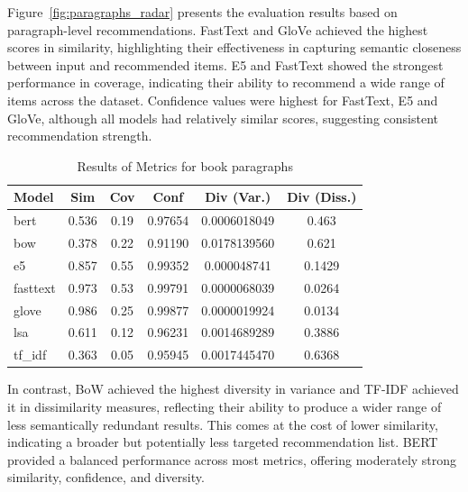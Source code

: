 \documentclass[\myFontSize,a4paper,oneside,hidelinks]{article}
\begin{document}
Figure~\ref{fig:paragraphs_radar} presents the evaluation results based on paragraph-level recommendations. FastText and GloVe achieved the highest scores in similarity, highlighting their effectiveness in capturing semantic closeness between input and recommended items. E5 and FastText showed the strongest performance in coverage, indicating their ability to recommend a wide range of items across the dataset. Confidence values were highest for FastText, E5 and GloVe, although all models had relatively similar scores, suggesting consistent recommendation strength.


\begin{table}[h!]
\centering
\large
\begin{tabular}{|l|c|c|c|c|c|}
\hline
\textbf{Model} & \textbf{Sim} & \textbf{Cov} & \textbf{Conf} & \textbf{Div (Var.)} & \textbf{Div (Diss.)} \\
\hline
bert     & 0.536 & 0.19 & 0.97654 & 0.0006018049  & 0.463  \\
bow      & 0.378 & 0.22 & 0.91190 & 0.0178139560  & 0.621  \\
e5		& 0.857 & 0.55 & 0.99352 & 0.000048741 & 0.1429 \\
fasttext & 0.973 & 0.53 & 0.99791 & 0.0000068039  & 0.0264 \\
glove    & 0.986 & 0.25 & 0.99877 & 0.0000019924  & 0.0134 \\
lsa      & 0.611 & 0.12 & 0.96231 & 0.0014689289  & 0.3886 \\
tf\_idf  & 0.363 & 0.05 & 0.95945 & 0.0017445470  & 0.6368 \\
\hline
\end{tabular}
\caption{Results of Metrics for book paragraphs}
\label{tab:metrics_para}
\end{table}


In contrast, BoW achieved the highest diversity in variance and TF-IDF achieved it in dissimilarity measures, reflecting their ability to produce a wider range of less semantically redundant results. This comes at the cost of lower similarity, indicating a broader but potentially less targeted recommendation list. BERT provided a balanced performance across most metrics, offering moderately strong similarity, confidence, and diversity.









\end{document}
